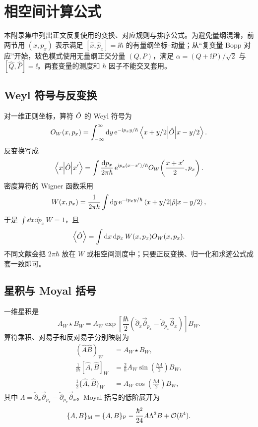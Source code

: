 \chapter{相空间计算公式}
\label{app:math}

本附录集中列出正文反复使用的变换、对应规则与排序公式。为避免量纲混淆，前两节用 $(x,p_x)$ 表示满足 $[\hat x,\hat p_x]=\ii\hbar$ 的有量纲坐标--动量；从“复变量 Bopp 对应”开始，玻色模式使用无量纲正交分量 $(Q,P)$，满足
$\alpha=(Q+\ii P)/\sqrt2$ 与 $[\hat Q,\hat P]=\ii$。两套变量的测度和 $\hbar$ 因子不能交叉套用。

\section{Weyl 符号与反变换}

对一维正则坐标，算符 $\hat O$ 的 Weyl 符号为
\begin{equation}
  O_W(x,p_x)=\int_{-\infty}^{\infty}\mathop{}\!\mathrm{d} y\,
  \mathrm{e}^{-\mathrm{i} p_x y/\hbar}
  \left\langle x+y/2\middle\vert \hat O\middle\vert x-y/2\right\rangle.
\end{equation}
反变换写成
\begin{equation}
  \left\langle x\middle\vert \hat O\middle\vert x'\right\rangle=
  \int\frac{\mathop{}\!\mathrm{d} p_x}{2\pi\hbar}\,
  \mathrm{e}^{\mathrm{i} p_x(x-x')/\hbar}
  O_W\!\left(\frac{x+x'}2,p_x\right).
\end{equation}
密度算符的 Wigner 函数采用
\begin{equation}
  W(x,p_x)=\frac{1}{2\pi\hbar}
  \int\mathop{}\!\mathrm{d} y\,\mathrm{e}^{-\mathrm{i} p_x y/\hbar}
  \left\langle x+y/2\middle\vert \hat\rho\middle\vert x-y/2\right\rangle,
\end{equation}
于是 $\int\dd x\dd p_x\,W=1$，且
\begin{equation}
  \left\langle \hat O\right\rangle=\int\mathop{}\!\mathrm{d} x\mathop{}\!\mathrm{d} p_x\,W(x,p_x)O_W(x,p_x).
\end{equation}
不同文献会把 $2\pi\hbar$ 放在 $W$ 或相空间测度中；只要正反变换、归一化和求迹公式成套一致即可。

\section{星积与 Moyal 括号}

一维星积是
\begin{equation}
  A_W\star B_W=A_W
  \exp\!\left[
  \frac{\ii\hbar}{2}
  \left(
  \overleftarrow\partial_x\overrightarrow\partial_{p_x}-
  \overleftarrow\partial_{p_x}\overrightarrow\partial_x
  \right)\right]B_W.
\end{equation}
算符乘积、对易子和反对易子分别映射为
\begin{align}
  (\hat A\hat B)_W&=A_W\star B_W,\\
  \frac{1}{\ii\hbar}[\hat A,\hat B]_W
  &=\frac{2}{\hbar}A_W\sin\!\left(\frac{\hbar\Lambda}{2}\right)B_W,\\
  \frac12\{\hat A,\hat B\}_W
  &=A_W\cos\!\left(\frac{\hbar\Lambda}{2}\right)B_W,
\end{align}
其中
$\Lambda=\overleftarrow\partial_x\overrightarrow\partial_{p_x}-
\overleftarrow\partial_{p_x}\overrightarrow\partial_x$。Moyal 括号的低阶展开为
\begin{equation}
  \{A,B\}_{\rm M}=\{A,B\}_{\rm P}
  -\frac{\hbar^2}{24}A\Lambda^3B+\mathcal{O}(\hbar^4).
\end{equation}

